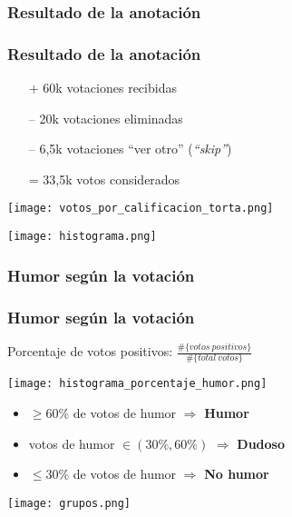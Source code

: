 \subsubsection{Resultado de la anotación}
\begin{frame}[allowframebreaks]
    \frametitle{Resultado de la anotación}

    \begin{itemize}
        \item[+] 60k votaciones recibidas
        \item[--] 20k votaciones eliminadas
        \item[--] 6,5k votaciones “ver otro” (\emph{“skip”})
        \item[=] 33,5k votos considerados
    \end{itemize}

    \framebreak

    \begin{center}
        \texttt{[image: votos\_por\_calificacion\_torta.png]}

        \texttt{[image: histograma.png]}
    \end{center}
\end{frame}

\subsubsection{Humor según la votación}

\begin{frame}[allowframebreaks]
    \frametitle{Humor según la votación}

    Porcentaje de votos positivos: $\frac{\#\{votos\ positivos\}}{\#\{total\ votos\}}$

    \begin{center}
        \texttt{[image: histograma\_porcentaje\_humor.png]}
    \end{center}

    \begin{itemize}
        \item $\geq 60\%$ de votos de humor $\Rightarrow$ \textbf{Humor}
        \item votos de humor $\in (30\%, 60\%)$ $\Rightarrow$ \textbf{Dudoso}
        \item $\leq 30\%$ de votos de humor $\Rightarrow$ \textbf{No humor}
    \end{itemize}

    \framebreak

    \begin{center}
        \texttt{[image: grupos.png]}
    \end{center}
\end{frame}

